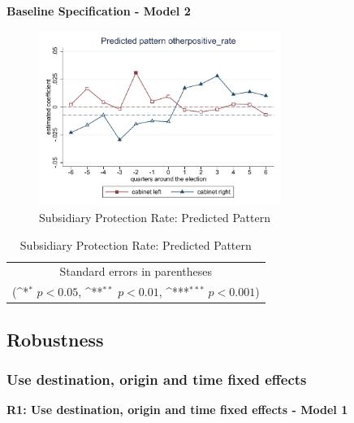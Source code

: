 \documentclass[10pt,a4paper]{scrartcl}
\begin{document}
\clearpage
\textbf{Baseline Specification - Model 2}
\begin{figure}[!ht]
	\centering
	\includegraphics[width=0.7\textwidth]{figures_edited/otherpositive_rate_graph2_baseline.pdf}
	\caption{Subsidiary Protection Rate: Predicted Pattern}
\end{figure}

\begin{table}[!ht]\centering
	\footnotesize
	\renewcommand{\arraystretch}{1.2}
	\def\sym#1{\ifmmode^{#1}\else\(^{#1}\)\fi}
	\caption{Subsidiary Protection Rate: Predicted Pattern}
	\begin{tabular}{l*{2}{c}}
		\hline\hline
		
		\hline\hline
		\multicolumn{3}{c}{\footnotesize Standard errors in parentheses} \\
		\multicolumn{3}{c}{\footnotesize (\sym{*} \(p<0.05\), \sym{**} \(p<0.01\), \sym{***} \(p<0.001\))}\\
	\end{tabular}
\end{table}



\FloatBarrier
\clearpage
\subsection{Robustness}

\subsubsection{Use destination, origin and time fixed effects}
\textbf{ R1: Use destination, origin and time fixed effects - Model 1}
\end{document}
